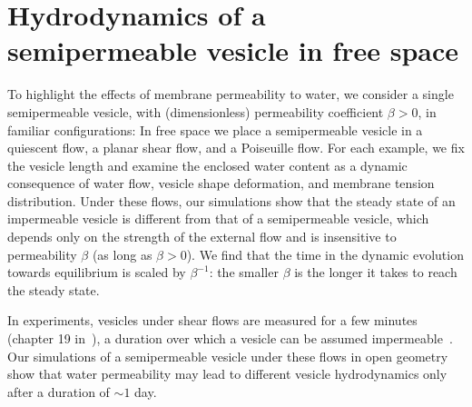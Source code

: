 \documentclass[prb,preprint,showpacs,preprintnumbers,amsmath,amssymb,longbibliography]{revtex4-1}
\begin{document}
\section{Hydrodynamics of a semipermeable vesicle in free space\label{sec:free_space}}
To highlight the effects of membrane permeability to water, we consider
a single semipermeable vesicle, with (dimensionless) permeability
coefficient $\beta>0$, in familiar configurations: In free space we
place a semipermeable vesicle in a quiescent flow, a planar shear flow,
and a Poiseuille flow. For each example, we fix the vesicle length and
examine the enclosed water content as a dynamic consequence of water
flow, vesicle shape deformation, and membrane tension distribution.
%
Under these flows, our simulations show
that the steady state of an impermeable vesicle is different from that of a semipermeable vesicle, which depends only on the strength of the external flow and is insensitive to permeability $\beta$ (as long as $\beta>0$). We find that  the time in the dynamic evolution towards equilibrium is scaled by $\beta^{-1}$: the smaller $\beta$ is the longer it takes to reach the steady state.

In experiments, vesicles under shear flows are measured for a few
minutes (chapter 19 in~\cite{Dimova2020_GVB}), a duration over which a
vesicle can be assumed impermeable~\cite{AbkarianViallat2005_BJ}. Our
simulations of a semipermeable vesicle under these flows in open
geometry show that water permeability may lead to different vesicle
hydrodynamics only after a duration of $\sim 1$ day. 



\end{document}
